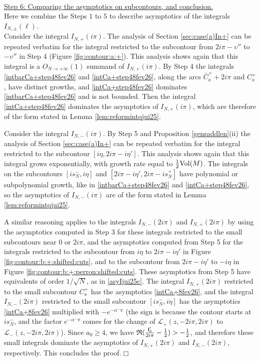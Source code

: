 \documentclass[11pt]{amsart}
\newcommand{\cvd}{\hfill$\Box$}
\def\cvd{\hfill$\Box$}
\begin{document}
\

\underline{Step 6: Comparing the asymptotics on subcontours, and conclusion.}\\
Here we combine the Steps $1$ to $5$ to describe asymptotics of the integrals $I_{N,\pm}(\ell)$.\\
Consider the integral $I_{N,+}(i\pi)$. The analysis of Section \ref{sec:case(a)In+} can be repeated verbatim for the integral restricted to the subcontour from $2i\pi-\upsilon''$ to $-\upsilon''$ in Step 4 (Figure \ref{fig:contour:a:+}). This analysis shows again that this integral is a $O_{N\to +\infty}(1)$ summand of $I_{N,+}(i\pi)$. By Step 4 the integrals \eqref{intbarCa+step48fev26} and \eqref{intCa+step48fev26}, along the arcs $\bar{C}^+_a +2i\pi$ and $C_a^+$, have distinct growths, and \eqref{intCa+step48fev26} dominates \eqref{intbarCa+step48fev26} and is not bounded. Then the integral \eqref{intCa+step48fev26} dominates the asymptotics of $I_{N,+}(i\pi)$, which are therefore of the form stated in Lemma \ref{lem:reformintqjui25}.

Consider the integral $I_{N,-}(i\pi)$. By Step 5 and Proposition \ref{gensaddlen}(ii) the analysis of Section \ref{sec:case(a)In+} can be repeated verbatim for the integral restricted to the subcontour $[i\eta,2i\pi-i\eta']$. This analysis shows again that this integral grows exponentially, with growth rate equal to $\textstyle \frac{1}{2}{\rm Vol}(M)$. The integrals on the subcontours $[is_N^-,i\eta]$ and $[2i\pi-i\eta', 2i\pi-is_N^+]$ have polynomial or subpolynomial growth, like in \eqref{intbarCa+step48fev26} and \eqref{intCa+step48fev26}, so the asymptotics of $I_{N,-}(i\pi)$ are of the form stated in Lemma \ref{lem:reformintqjui25}.

A similar reasoning applies to the integrals $I_{N,-}(2i\pi)$ and $I_{N,+}(2i\pi)$ by using the asymptotics computed in Step 3 for these integrals restricted to the small subcontours near $0$ or $2i\pi$, and the asymptotics computed from Step 5 for the integrals restricted to the subcontour from $i\eta$ to $2i\pi - i\eta'$ in Figure \ref{fig:contour:b:+:shifted:cuts}, and to the subcontour from $2i\pi-i\eta'$ to $-i\eta$ in Figure \ref{fig:contour:b:+:perron:shifted:cuts}. These asymptotics from Step 5 have equivalents of order $1/\sqrt{N}$, as in \eqref{asyIjui25c}. The integral $I_{N,+}(2i\pi)$ restricted to the small subcontour $C_a^+$ has the asymptotics \eqref{intCa+8fev26}, and the integral $I_{N,-}(2i\pi)$ restricted to the small subcontour $[is_N^-,i\eta]$ has the asymptotics \eqref{intCa+8fev26} multiplied with $-e^{-\alpha^-\pi}$ (the sign is because the contour starts at $is_N^-$, and the factor $e^{-\alpha^-\pi}$ comes for the change of $\mathcal{L}_+(z,-2i\pi,2i\pi)$ to $\mathcal{L}_-(z,-2i\pi,2i\pi)$). 
Since $a_0\geq 4$, we have $\textstyle \mathfrak{R}(\frac{{\bf l}_0'}{2i\pi}-\frac{1}{2}) >-\frac{1}{2}$, and therefore these small integrals dominate the asymptotics of $I_{N,+}(2i\pi)$ and $I_{N,-}(2i\pi)$, respectively. This concludes the proof.\cvd
\medskip
\end{document}
